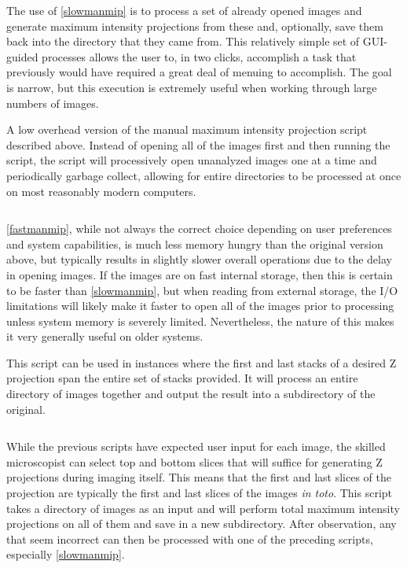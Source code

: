 The use of \autoref{slowmanmip} is to process a set of already opened images and generate maximum intensity projections from these and, optionally, save them back into the directory that they came from. This relatively simple set of GUI-guided processes allows the user to, in two clicks, accomplish a task that previously would have required a great deal of menuing to accomplish. The goal is narrow, but this execution is extremely useful when working through large numbers of images.

\begin{code}
\caption{A low overhead version of the manual maximum intensity projection script described above. Instead of opening all of the images first and then running the script, the script will processively open unanalyzed images one at a time and periodically garbage collect, allowing for entire directories to be processed at once on most reasonably modern computers.}
\label{fastmanmip}

\inputminted[breaklines,frame=single,fontsize=\small]{python}{source/fast_manMIPper.py}

\end{code}

\autoref{fastmanmip}, while not always the correct choice depending on user preferences and system capabilities, is much less memory hungry than the original version above, but typically results in slightly slower overall operations due to the delay in opening images. If the images are on fast internal storage, then this is certain to be faster than \autoref{slowmanmip}, but when reading from external storage, the I/O limitations will likely make it faster to open all of the images prior to processing unless system memory is severely limited. Nevertheless, the nature of this makes it very generally useful on older systems.

\begin{code}
\caption{This script can be used in instances where the first and last stacks of a desired Z projection span the entire set of stacks provided. It will process an entire directory of images together and output the result into a subdirectory of the original.}
\label{bulkmip}

\inputminted[breaklines,frame=single,fontsize=\small]{python}{source/bulkMIPper.py}

\end{code}

While the previous scripts have expected user input for each image, the skilled microscopist can select top and bottom slices that will suffice for generating Z projections during imaging itself. This means that the first and last slices of the projection are typically the first and last slices of the images \textit{in toto}. This script takes a directory of images as an input and will perform total maximum intensity projections on all of them and save in a new subdirectory. After observation, any that seem incorrect can then be processed with one of the preceding scripts, especially \autoref{slowmanmip}. 

